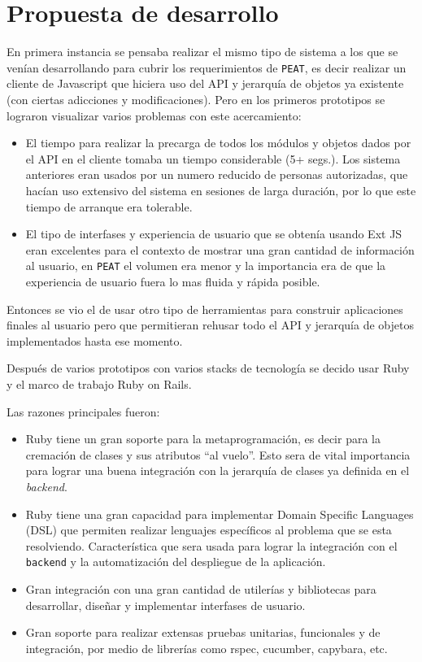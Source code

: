 \section{Propuesta de desarrollo}
En primera instancia se pensaba realizar el mismo tipo de sistema
a los que se venían desarrollando para cubrir los requerimientos
de \texttt{PEAT}, es decir realizar un cliente
de Javascript que hiciera uso del API y jerarquía de objetos ya
existente (con ciertas adicciones y modificaciones). Pero en los
primeros prototipos se lograron visualizar varios problemas con
este acercamiento:

\begin{itemize}
\item El tiempo para realizar la precarga de todos los módulos y
  objetos dados por el API en el cliente tomaba un tiempo
  considerable (5+ segs.). Los sistema anteriores eran usados
  por un numero reducido de personas autorizadas, que hacían uso
  extensivo del sistema en sesiones de larga duración, por lo
  que este tiempo de arranque era tolerable.
\item El tipo de interfases y experiencia de usuario que se obtenía
  usando Ext JS eran excelentes para el contexto de mostrar una gran
  cantidad de información al usuario, en \texttt{PEAT} el volumen
  era menor y la importancia era de que la experiencia de usuario
  fuera lo mas fluida y rápida posible.
\end{itemize}

Entonces se vio el de usar otro tipo de herramientas para construir
aplicaciones finales al usuario pero que permitieran rehusar todo el API
y jerarquía de objetos implementados hasta ese momento.

Después de varios prototipos con varios stacks de tecnología se decido
usar Ruby y el marco de trabajo Ruby on Rails.

Las razones principales fueron:
\begin{itemize}
\item Ruby tiene un gran soporte para la metaprogramación, es decir para la cremación
  de clases y sus atributos ``al vuelo''. Esto sera de vital importancia para lograr
  una buena integración con la jerarquía de clases ya definida en el \textit{backend}.
\item Ruby tiene una gran capacidad para implementar Domain Specific Languages (DSL)
  que permiten realizar lenguajes específicos al problema que se esta resolviendo.
  Característica que sera usada para lograr la integración con el
  \texttt{backend} y la automatización del despliegue de la aplicación.
\item Gran integración con una gran cantidad de utilerías y bibliotecas para
  desarrollar, diseñar y implementar interfases de usuario.
\item Gran soporte para realizar extensas pruebas unitarias, funcionales
  y de integración, por medio de librerías como rspec, cucumber, capybara, etc.
\end{itemize}

